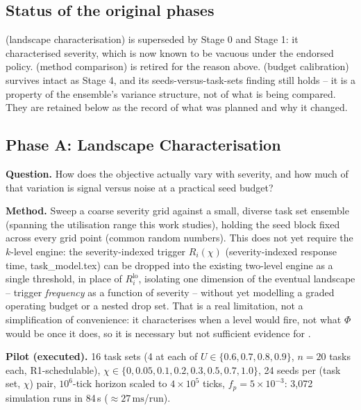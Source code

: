 \documentclass{article}
\begin{document}
\subsection{Status of the original phases}

 (landscape characterisation) is superseded by Stage 0 and
Stage 1: it characterised severity, which is now known to be vacuous under the
endorsed policy.  (method comparison) is retired for the
reason above.  (budget calibration) survives intact as
Stage 4, and its seeds-versus-task-sets finding still holds -- it is a property
of the ensemble's variance structure, not of what is being compared. They are
retained below as the record of what was planned and why it changed.

\subsection{Phase A: Landscape Characterisation}
\label{sec:phase-a}

\textbf{Question.} How does the objective actually vary with severity, and
how much of that variation is signal versus noise at a practical seed
budget?

\textbf{Method.} Sweep a coarse severity grid against a small, diverse task
set ensemble (spanning the utilisation range this work studies), holding the
seed block fixed across every grid point (common random numbers). This does
not yet require the $k$-level engine: the severity-indexed trigger
$R_i(\chi)$ (severity-indexed response time, task\_model.tex) can be dropped
into the existing two-level engine as a single threshold, in place of
$R_i^{\mathrm{lo}}$, isolating one dimension of the eventual landscape --
trigger \emph{frequency} as a function of severity -- without yet modelling a
graded operating budget or a nested drop set. That is a real limitation, not
a simplification of convenience: it characterises when a level would fire,
not what $\Phi$ would be once it does, so it is necessary but not sufficient
evidence for .

\textbf{Pilot (executed).} 16 task sets (4 at each of $U \in \{0.6, 0.7, 0.8,
0.9\}$, $n=20$ tasks each, R1-schedulable), $\chi \in \{0, 0.05, 0.1, 0.2,
0.3, 0.5, 0.7, 1.0\}$, 24 seeds per (task set, $\chi$) pair, $10^6$-tick
horizon scaled to $4{\times}10^5$ ticks, $f_p = 5{\times}10^{-3}$: 3{,}072
simulation runs in 84\,s ($\approx 27\,\mathrm{ms}$/run).
\end{document}
